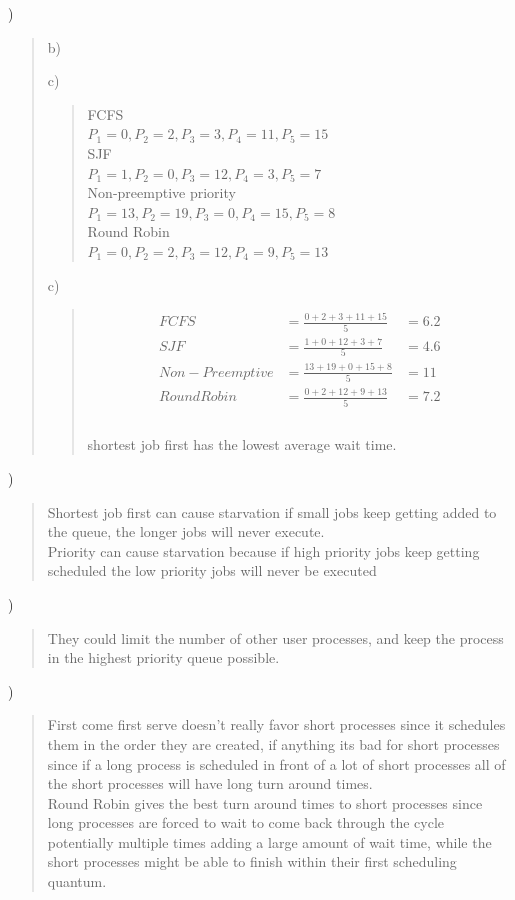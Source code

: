 \documentclass[11pt]{article}
\newenvironment{subquestion}[1]{#1) \begin{quote}}{\end{quote}}
\begin{document}
\begin{subquestion}{6.16}
\begin{subquestion}{b}
    \end{subquestion}
    \begin{subquestion}{c}
      \begin{center}
        FCFS\\
        $P_1 = 0, P_2 = 2, P_3 = 3, P_4 = 11, P_5 = 15$\\
        SJF\\
        $P_1 = 1, P_2 = 0, P_3 = 12, P_4 = 3, P_5 = 7$\\
        Non-preemptive priority\\
        $P_1 = 13, P_2 = 19, P_3 = 0, P_4 = 15, P_5 = 8$\\
        Round Robin\\
        $P_1 = 0, P_2 = 2, P_3 = 12, P_4 = 9, P_5 = 13$\\
      \end{center}
    \end{subquestion}
    \begin{subquestion}{c}
      \begin{align*}
        FCFS &= \frac{0+2+3+11+15}{5} &= 6.2\\
        SJF &= \frac{1+0+12+3+7}{5} &= 4.6\\
        Non-Preemptive &= \frac{13+19+0+15+8}{5} &= 11\\
        Round Robin &= \frac{0+2+12+9+13}{5} &= 7.2\\
      \end{align*}\\
      shortest job first has the lowest average wait time.
    \end{subquestion}
  \end{subquestion}

  \clearpage

  \begin{subquestion}{6.19}
    Shortest job first can cause starvation if small jobs keep getting added to the queue, the longer jobs will
    never execute.\\
    Priority can cause starvation because if high priority jobs keep getting scheduled the low priority jobs will never be executed
  \end{subquestion}

  \begin{subquestion}{6.22}
    They could limit the number of other user processes, and keep the process in the highest priority queue possible.
  \end{subquestion}

  \begin{subquestion}{6.22}
    First come first serve doesn't really favor short processes since it schedules them in the order they are created, if anything
    its bad for short processes since if a long process is scheduled in front of a lot of short processes all of the short processes will have
    long turn around times.\\
    Round Robin gives the best turn around times to short processes since long processes are forced to wait to come back through the cycle potentially multiple times
    adding a large amount of wait time, while the short processes might be able to finish within their first scheduling quantum.
  \end{subquestion}
\end{document}
